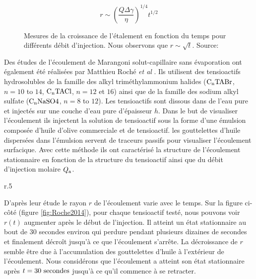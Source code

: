 \begin{equation}
  r \sim \left(\dfrac{Q\Delta\gamma}{\eta}\right)^{1/4}t^{1/2}\label{eq:Federico2015}
\end{equation}

\begin{figure}[!ht]
  \begin{center}
    
    \caption{Mesures de la croissance de l'étalement en fonction du temps pour différents débit d'injection. Nous observons que $r\sim \sqrt{t}$. Source: \cite{Federico2015}}
    \label{fig:Federico2014}
  \end{center}
\end{figure}
Des études de l'écoulement de Marangoni solut-capillaire sans évaporation ont également été réalisées par Matthieu Roché  \textit{et al} \cite{Roche2014}.  Ils utilisent des tensioactifs hydrosolubles de la famille des alkyl triméthylammonium halides ($\rm C_nTABr$, $n=10$ to $14$, $\rm C_nTACl$, $n = 12$ et $16$) ainsi que de la famille des sodium alkyl sulfate ($\rm C_nNaSO4$, $n=8$ to $12$). Les tensioactifs sont dissous dans de l'eau pure et injectés sur une couche d'eau pure d'épaisseur $h$. Dans le but de visualiser l'écoulement ils injectent la solution de tensioactif sous la forme d'une émulsion composée d'huile d'olive commerciale et de tensioactif. les gouttelettes d'huile dispersées dans l'émulsion servent de traceurs passifs pour visualiser l'écoulement surfacique. Avec cette méthode ils ont caractérisé la structure de l'écoulement stationnaire en fonction de la structure du tensioactif ainsi que du débit d'injection molaire $Q_{\rm a}$.


\begin{wrapfigure}{r}{.5\textwidth}
  
  \caption{Caractérisation de l'écoulement en fonction de la structure du tensioactif.  Crédit: \cite{Roche2014}}
  \label{fig:Roche2014}
\end{wrapfigure}
D'après leur étude le rayon $r$ de l'écoulement varie avec le temps. Sur la figure ci-côté (figure \ref{fig:Roche2014}), pour chaque tensioactif testé,  nous pouvons voir $r(t)$ augmenter après le début de l'injection. Il atteint un état stationnaire au bout de $30$ secondes environ qui perdure pendant plusieurs dizaines de secondes et finalement décroît jusqu'à ce que l'écoulement s'arrête. La décroissance de $r$ semble être due à l'accumulation des gouttelettes d'huile à l'extérieur de l'écoulement.  Nous considérons que l'écoulement a atteint son état stationnaire après $t=30~\rm secondes$ jusqu'à ce qu'il commence à se retracter. 

